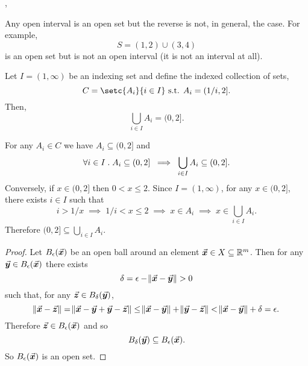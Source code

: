 \documentclass[../MathsNotesBase.tex]{subfiles}
\begin{document}
{		
		\nl[6]
		\sep
		\begin{exe}
			\ex Any open interval is an open set but the reverse is not, in general, the case. For example,
			\[ S = (1,2) \cup (3,4) \]
			is an open set but is not an open interval (it is not an interval at all).
			
			\bigskip
			\ex Let ${ I = (1,\infty) }$ be an indexing set and define the indexed collection of sets,
			\[ C = \setc{A_i}{i \in I} \suchthat A_i = (1/i, 2]. \]
			Then,
			\[ \bigcup_{i \in I} A_i = (0, 2]. \]
			
			\nl[12]
			For any ${ A_i \in C }$ we have ${ A_i \subseteq (0, 2] }$ and
			\[ \forall i \in I \;.\; A_i \subseteq (0, 2] \; \implies \; \bigcup_{i \in I} A_i \subseteq (0, 2]. \]
			Conversely, if ${ x \in (0, 2] }$ then ${ 0 < x \leq 2 }$. Since ${ I = (1,\infty) }$, for any ${ x \in (0, 2] }$, there exists ${ i \in I }$ such that
			\[ i > 1/x \; \implies \; 1/i < x \leq 2 \; \implies \; x \in A_i \; \implies \; x \in \bigcup_{i \in I} A_i. \]
			Therefore ${ (0, 2] \subseteq \bigcup_{i \in I} A_i }$.
		\end{exe}
	
	
		\nl[16]
		\nl[4]
	
	
		\biggerskip
		\begin{proof}
			Let ${ B_\epsilon(\vec{\bm{x}}) }$ be an open ball around an element ${ \vec{\bm{x}} \in X \subseteq \mathbb{R}^{m} }$. Then for any ${ \vec{\bm{y}} \in B_\epsilon(\vec{\bm{x}}) }$ there exists
			\[ \delta = \epsilon - \norm{\vec{\bm{x}} - \vec{\bm{y}}} > 0 \]
			such that, for any ${ \vec{\bm{z}} \in B_\delta(\vec{\bm{y}}) }$,
			\[ \norm{\vec{\bm{x}} - \vec{\bm{z}}} = \norm{\vec{\bm{x}} - \vec{\bm{y}} + \vec{\bm{y}} - \vec{\bm{z}}} \leq \norm{\vec{\bm{x}} - \vec{\bm{y}}} + \norm{\vec{\bm{y}} - \vec{\bm{z}}} < \norm{\vec{\bm{x}} - \vec{\bm{y}}} + \delta = \epsilon. \]
			Therefore ${ \vec{\bm{z}} \in B_\epsilon(\vec{\bm{x}}) }$ and so
			\[ B_\delta(\vec{\bm{y}}) \subseteq B_\epsilon(\vec{\bm{x}}). \]
			So ${ B_\epsilon(\vec{\bm{x}}) }$ is an open set.
		\end{proof}
	
}
\end{document}
